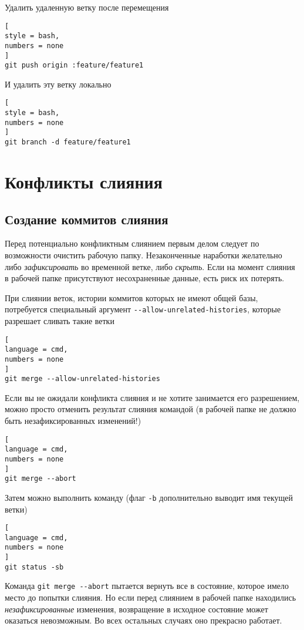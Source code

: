 \documentclass[%
	11pt,
	a4paper,
	utf8,
		]{article}
\begin{document}
Удалить удаленную ветку после перемещения
\begin{lstlisting}[
style = bash,
numbers = none
]
git push origin :feature/feature1
\end{lstlisting}

И удалить эту ветку локально
\begin{lstlisting}[
style = bash,
numbers = none
]
git branch -d feature/feature1
\end{lstlisting}



\section{Конфликты слияния}

\subsection{Создание коммитов слияния}

Перед потенциально конфликтным слиянием первым делом следует по возможности очистить рабочую папку. Незаконченные наработки желательно либо \emph{зафиксировать} во временной ветке, либо \emph{скрыть}. Если на момент слияния в рабочей папке присутствуют несохраненные данные, есть риск их потерять.

При слиянии веток, истории коммитов которых не имеют общей базы, потребуется специальный аргумент \verb|--allow-unrelated-histories|, которые разрешает сливать такие ветки
\begin{lstlisting}[
language = cmd,
numbers = none
]
git merge --allow-unrelated-histories
\end{lstlisting}

Если вы не ожидали конфликта слияния и не хотите занимается его разрешением, можно просто отменить результат слияния командой (в рабочей папке не должно быть незафиксированных изменений!)
\begin{lstlisting}[
language = cmd,
numbers = none
]
git merge --abort
\end{lstlisting}

Затем можно выполнить команду (флаг \verb|-b| дополнительно выводит имя текущей ветки)
\begin{lstlisting}[
language = cmd,
numbers = none
]
git status -sb
\end{lstlisting}

Команда \verb|git merge --abort| пытается вернуть все в состояние, которое имело место до попытки слияния. Но если перед слиянием в рабочей папке находились \emph{незафиксированные} изменения, возвращение в исходное состояние может оказаться невозможным. Во всех остальных случаях оно прекрасно работает.
\end{document}
